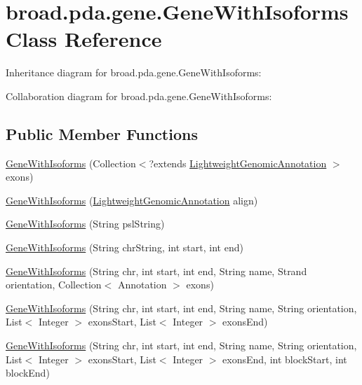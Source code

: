 \hypertarget{classbroad_1_1pda_1_1gene_1_1_gene_with_isoforms}{\section{broad.\+pda.\+gene.\+Gene\+With\+Isoforms Class Reference}
\label{classbroad_1_1pda_1_1gene_1_1_gene_with_isoforms}
}


Inheritance diagram for broad.\+pda.\+gene.\+Gene\+With\+Isoforms\+:


Collaboration diagram for broad.\+pda.\+gene.\+Gene\+With\+Isoforms\+:
\subsection*{Public Member Functions}
\begin{DoxyCompactItemize}
\item 
\hyperlink{classbroad_1_1pda_1_1gene_1_1_gene_with_isoforms_a701d20a3c35b334ae246b381d545d4d2}{Gene\+With\+Isoforms} (Collection$<$?extends \hyperlink{interfacebroad_1_1core_1_1annotation_1_1_lightweight_genomic_annotation}{Lightweight\+Genomic\+Annotation} $>$ exons)
\item 
\hyperlink{classbroad_1_1pda_1_1gene_1_1_gene_with_isoforms_a8fc0d56f40f799f1cfc24c4d3478021d}{Gene\+With\+Isoforms} (\hyperlink{interfacebroad_1_1core_1_1annotation_1_1_lightweight_genomic_annotation}{Lightweight\+Genomic\+Annotation} align)
\item 
\hyperlink{classbroad_1_1pda_1_1gene_1_1_gene_with_isoforms_abb9600dbf34a73d564952624591e2135}{Gene\+With\+Isoforms} (String psl\+String)
\item 
\hyperlink{classbroad_1_1pda_1_1gene_1_1_gene_with_isoforms_a7fc3d08707815c6d69f2f77c09b0bb29}{Gene\+With\+Isoforms} (String chr\+String, int start, int end)
\item 
\hyperlink{classbroad_1_1pda_1_1gene_1_1_gene_with_isoforms_ab3f8475f309186f000e8de82094171cf}{Gene\+With\+Isoforms} (String chr, int start, int end, String name, Strand orientation, Collection$<$ Annotation $>$ exons)
\item 
\hyperlink{classbroad_1_1pda_1_1gene_1_1_gene_with_isoforms_ac87bc14df915a2b8d9f5ba0820fa1050}{Gene\+With\+Isoforms} (String chr, int start, int end, String name, String orientation, List$<$ Integer $>$ exons\+Start, List$<$ Integer $>$ exons\+End)
\item 
\hyperlink{classbroad_1_1pda_1_1gene_1_1_gene_with_isoforms_ab020567f1f71fe12ae12b6df6764d101}{Gene\+With\+Isoforms} (String chr, int start, int end, String name, String orientation, List$<$ Integer $>$ exons\+Start, List$<$ Integer $>$ exons\+End, int block\+Start, int block\+End)

\end{DoxyCompactItemize}

